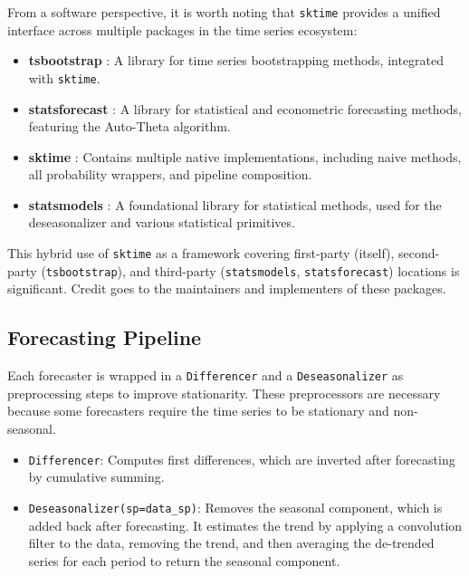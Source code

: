 From a software perspective, it is worth noting that \texttt{sktime} provides a unified interface across multiple packages in the time series ecosystem:

\begin{itemize}
    \item \textbf{tsbootstrap} \cite{gilda_2024_10866090_tsbootstrap, gilda2024tsbootstrap}: A library for time series bootstrapping methods, integrated with \texttt{sktime}.
    \item \textbf{statsforecast} \cite{garza2022statsforecast}: A library for statistical and econometric forecasting methods, featuring the Auto-Theta algorithm.
    \item \textbf{sktime} \cite{franz_kiraly_2024_11095261_sktime}: Contains multiple native implementations, including naive methods, all probability wrappers, and pipeline composition.
    \item \textbf{statsmodels} \cite{seabold2010statsmodels}: A foundational library for statistical methods, used for the deseasonalizer and various statistical primitives.
\end{itemize}

This hybrid use of \texttt{sktime} as a framework covering first-party (itself), second-party (\texttt{tsbootstrap}), and third-party (\texttt{statsmodels}, \texttt{statsforecast}) locations is significant. Credit goes to the maintainers and implementers of these packages.

\subsection{Forecasting Pipeline}
Each forecaster is wrapped in a \texttt{Differencer} and a \texttt{Deseasonalizer} as preprocessing steps to improve stationarity. These preprocessors are necessary because some forecasters require the time series to be stationary and non-seasonal.

\begin{itemize}
    \item \texttt{Differencer}: Computes first differences, which are inverted after forecasting by cumulative summing.
    \item \texttt{Deseasonalizer(sp=data\_sp)}: Removes the seasonal component, which is added back after forecasting. It estimates the trend by applying a convolution filter to the data, removing the trend, and then averaging the de-trended series for each period to return the seasonal component.
\end{itemize}

